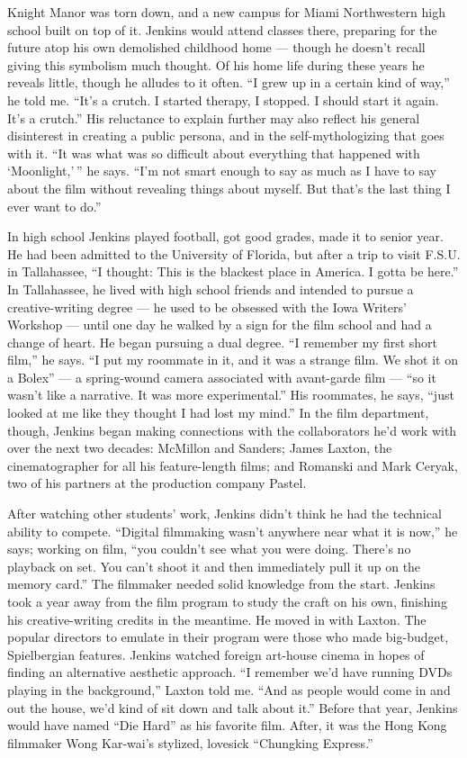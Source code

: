 Knight Manor was torn down, and a new campus for Miami Northwestern high
school built on top of it. Jenkins would attend classes there, preparing
for the future atop his own demolished childhood home --- though he
doesn't recall giving this symbolism much thought. Of his home life
during these years he reveals little, though he alludes to it often. ``I
grew up in a certain kind of way,'' he told me. ``It's a crutch. I
started therapy, I stopped. I should start it again. It's a crutch.''
His reluctance to explain further may also reflect his general
disinterest in creating a public persona, and in the self-mythologizing
that goes with it. ``It was what was so difficult about everything that
happened with `Moonlight,' '' he says. ``I'm not smart enough to say as
much as I have to say about the film without revealing things about
myself. But that's the last thing I ever want to do.''

In high school Jenkins played football, got good grades, made it to
senior year. He had been admitted to the University of Florida, but
after a trip to visit F.S.U. in Tallahassee, ``I thought: This is the
blackest place in America. I gotta be here.'' In Tallahassee, he lived
with high school friends and intended to pursue a creative-writing
degree --- he used to be obsessed with the Iowa Writers' Workshop ---
until one day he walked by a sign for the film school and had a change
of heart. He began pursuing a dual degree. ``I remember my first short
film,'' he says. ``I put my roommate in it, and it was a strange film.
We shot it on a Bolex'' --- a spring-wound camera associated with
avant-garde film --- ``so it wasn't like a narrative. It was more
experimental.'' His roommates, he says, ``just looked at me like they
thought I had lost my mind.'' In the film department, though, Jenkins
began making connections with the collaborators he'd work with over the
next two decades: McMillon and Sanders; James Laxton, the
cinematographer for all his feature-length films; and Romanski and Mark
Ceryak, two of his partners at the production company Pastel.

After watching other students' work, Jenkins didn't think he had the
technical ability to compete. ``Digital filmmaking wasn't anywhere near
what it is now,'' he says; working on film, ``you couldn't see what you
were doing. There's no playback on set. You can't shoot it and then
immediately pull it up on the memory card.'' The filmmaker needed solid
knowledge from the start. Jenkins took a year away from the film program
to study the craft on his own, finishing his creative-writing credits in
the meantime. He moved in with Laxton. The popular directors to emulate
in their program were those who made big-budget, Spielbergian features.
Jenkins watched foreign art-house cinema in hopes of finding an
alternative aesthetic approach. ``I remember we'd have running DVDs
playing in the background,'' Laxton told me. ``And as people would come
in and out the house, we'd kind of sit down and talk about it.'' Before
that year, Jenkins would have named ``Die Hard'' as his favorite film.
After, it was the Hong Kong filmmaker Wong Kar-wai's stylized, lovesick
``Chungking Express.''

